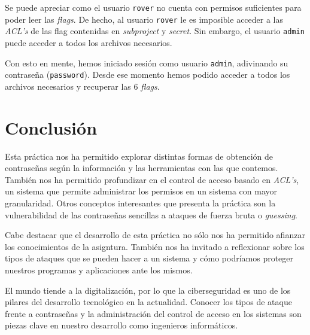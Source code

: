 \documentclass[]{article}
\begin{document}
\vspace{0.5cm}

Se puede apreciar como el usuario \texttt{rover} no cuenta con permisos suficientes para poder leer las \textit{flags}. De hecho, al usuario \texttt{rover} le es imposible acceder a las \textit{ACL's} de las flag contenidas en \textit{subproject} y \textit{secret}. Sin embargo, el usuario \texttt{admin} puede acceder a todos los archivos necesarios.

Con esto en mente, hemos iniciado sesión como usuario \texttt{admin}, adivinando su contraseña (\texttt{password}). Desde ese momento hemos podido acceder a todos los archivos necesarios y recuperar las 6 \textit{flags}.

\section{Conclusión}
\label{sec:conclusion}

Esta práctica nos ha permitido explorar distintas formas de obtención de contraseñas según la información y las herramientas con las que contemos. También nos ha permitido profundizar en el control de acceso basado en \textit{ACL's}, un sistema que permite administrar los permisos en un sistema con mayor granularidad. Otros conceptos interesantes que presenta la práctica son la vulnerabilidad de las contraseñas sencillas a ataques de fuerza bruta o \textit{guessing}.

Cabe destacar que el desarrollo de esta práctica no sólo nos ha permitido afianzar los conocimientos de la asigntura. También nos ha invitado a reflexionar sobre los tipos de ataques que se pueden hacer a un sistema y cómo podríamos proteger nuestros programas y aplicaciones ante los mismos.

El mundo tiende a la digitalización, por lo que la ciberseguridad es uno de los pilares del desarrollo tecnológico en la actualidad. Conocer los tipos de ataque frente a contraseñas y la administración del control de acceso en los sistemas son piezas clave en nuestro desarrollo como ingenieros informáticos.
\end{document}
